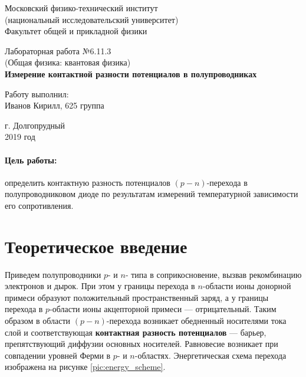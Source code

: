 \documentclass[12pt]{kiarticle}
\begin{document}
	
	\begin{titlepage}
		\begin{center}
			\large 	Московский физико-технический институт \\
				(национальный исследовательский университет) \\
			Факультет общей и прикладной физики \\
			\vspace{0.2cm}
			
			\vspace{4.5cm}
			Лабораторная работа №6.11.3  \\ \vspace{0.2cm}
			\large (Общая физика: квантовая физика) \\ \vspace{0.2cm}
			\LARGE \textbf{  Измерение контактной разности потенциалов в полупроводниках }
		\end{center}
		\vspace{2.3cm} \large
		
		\begin{center}
			Работу выполнил: \\
			Иванов Кирилл,
			625 группа
			\vspace{10mm}		
			
		\end{center}
		
		\begin{center} \vspace{60mm}
			г. Долгопрудный \\
			2019 год
		\end{center}
	\end{titlepage}


	\paragraph*{Цель работы:} определить контактную разность потенциалов $(p-n)$-перехода в полупроводниковом диоде по результатам измерений температурной зависимости его сопротивления. 
	
	
	
	\section{Теоретическое введение}
	
	Приведем полупроводники $p$- и $n$- типа в соприкосновение, вызвав рекомбинацию электронов и дырок. При этом у границы перехода в $n$-области ионы донорной примеси образуют положительный пространственный заряд, а у границы перехода в $p$-области ионы акцепторной примеси --- отрицательный. Таким образом в области $(p-n)$-перехода возникает обедненный носителями тока слой и соответствующая \textbf{контактная разность потенциалов} --- барьер, препятствующий диффузии основных носителей. Равновесие возникает при совпадении уровней Ферми в $p$- и $n$-областях. Энергетическая схема перехода изображена на рисунке \ref{pic:energy_scheme}. 
	
\end{document}
